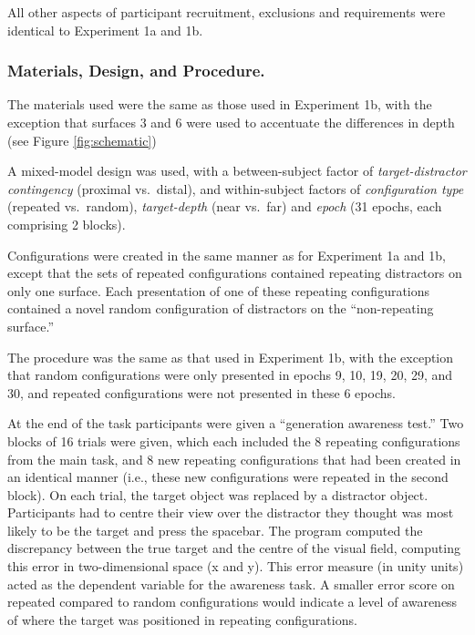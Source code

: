 \documentclass[
  english,
  man,floatsintext]{apa7}
\begin{document}
All other aspects of participant recruitment, exclusions and requirements were identical to Experiment 1a and 1b.

\hypertarget{materials-design-and-procedure.-1}{%
\subsubsection{Materials, Design, and Procedure.}\label{materials-design-and-procedure.-1}}

The materials used were the same as those used in Experiment 1b, with the exception that surfaces 3 and 6 were used to accentuate the differences in depth (see Figure \ref{fig:schematic})

A mixed-model design was used, with a between-subject factor of \emph{target-distractor contingency} (proximal vs.~distal), and within-subject factors of \emph{configuration type} (repeated vs.~random), \emph{target-depth} (near vs.~far) and \emph{epoch} (31 epochs, each comprising 2 blocks).

Configurations were created in the same manner as for Experiment 1a and 1b, except that the sets of repeated configurations contained repeating distractors on only one surface. Each presentation of one of these repeating configurations contained a novel random configuration of distractors on the ``non-repeating surface.''

The procedure was the same as that used in Experiment 1b, with the exception that random configurations were only presented in epochs 9, 10, 19, 20, 29, and 30, and repeated configurations were not presented in these 6 epochs.

At the end of the task participants were given a ``generation awareness test.'' Two blocks of 16 trials were given, which each included the 8 repeating configurations from the main task, and 8 new repeating configurations that had been created in an identical manner (i.e., these new configurations were repeated in the second block). On each trial, the target object was replaced by a distractor object. Participants had to centre their view over the distractor they thought was most likely to be the target and press the spacebar. The program computed the discrepancy between the true target and the centre of the visual field, computing this error in two-dimensional space (x and y). This error measure (in unity units) acted as the dependent variable for the awareness task. A smaller error score on repeated compared to random configurations would indicate a level of awareness of where the target was positioned in repeating configurations.
\end{document}
